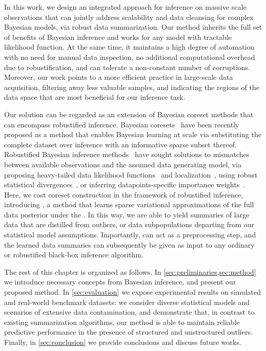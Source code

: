 In this work, we design an integrated approach for inference on massive scale observations that can jointly address scalability and data cleansing for complex Bayesian models, via robust data summarization. Our method inherits the full set of benefits of Bayesian inference and works for any model with tractable likelihood function. At the same time, it maintains a high degree of automation with no need for manual data inspection, no additional computational overhead due to robustification, and can tolerate a non-constant number of corruptions. Moreover, our work points to a more efficient practice in large-scale data acquisition, filtering away less valuable samples, and indicating the regions of the data space that are most beneficial for our inference task. 

Our solution can be regarded as an extension of Bayesian coreset methods that can encompass robustified inference. Bayesian coresets~\cite{huggins16, campbell19jmlr, campbell19neurips} have been recently proposed as a method that enables Bayesian learning at scale via substituting the complete dataset over inference with an informative sparse subset thereof. Robustified Bayesian inference methods~\cite{berger94} have sought solutions to mismatches between available observations and the assumed data generating model, %
via proposing heavy-tailed data likelihood functions~\cite{huber09, insua12} and localization~\cite{definetti61, wang18}, using robust statistical divergences~\cite{futami18, knoblauch18, miller19},  or inferring datapoints-specific importance weights~\cite{wang17}. Here, we cast coreset construction in the framework of robustified inference, introducing \emph{\bcores{}}, a method that learns sparse variational approximations of the full data posterior under the \bdiv{}. In this way, we are able to yield summaries of large data that are distilled from outliers, or data subpopulations departing from our statistical model assumptions. Importantly, \bcores{} can act as a preprocessing step, and the learned data summaries can subsequently be given as input to any ordinary or robustified black-box inference algorithm.

The rest of this chapter is organized as follows. In \cref{sec:preliminaries,sec:method} we introduce necessary concepts from Bayesian inference, and present our proposed method. In \cref{sec:evaluation} we expose experimental results on simulated and real-world benchmark datasets: we consider diverse statistical models and scenarios of extensive data contamination, and demonstrate that, in contrast to existing summarization algorithms, our method is able to maintain reliable predictive performance in the presence of structured and unstructured outliers. Finally, in \cref{sec:conclusion} we provide conclusions and discuss future works.




